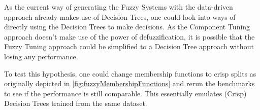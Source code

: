 As the current way of generating the Fuzzy Systems with the data-driven approach already makes use of Decision Trees, one could look into ways of directly using the Decision Trees to make decisions.
As the Component Tuning approach doesn't make use of the power of defuzzification, it is possible that the Fuzzy Tuning approach could be simplified to a Decision Tree approach without losing any performance.

To test this hypothesis, one could change membership functions to crisp splits as originally depicted in \autoref{fig:fuzzyMembershipFunctions} and rerun the benchmarks to see if the performance is still comparable. This essentially emulates (Crisp) Decision Trees trained from the same dataset.